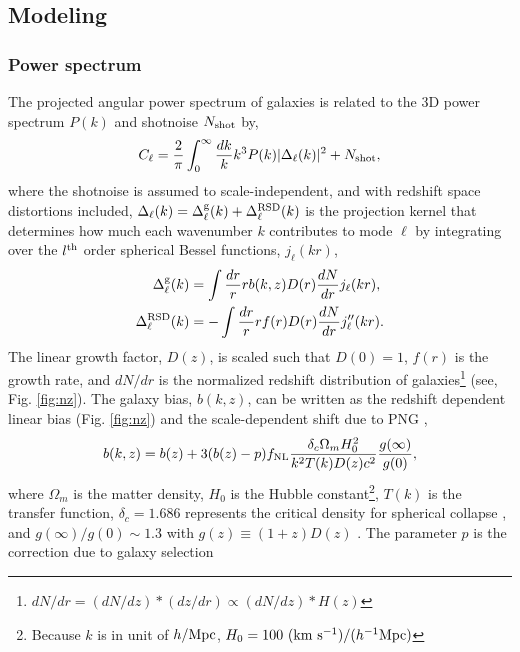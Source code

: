  \subsection{Modeling}

\subsubsection{Power spectrum}
The projected angular power spectrum of galaxies is related to the 3D power spectrum $P(k)$  \citep[see, e.g.,][]{Padmanabhan2007} and shotnoise $N_{\rm shot}$ by,
\begin{equation}\label{eq:cell}
    C_{\ell} = \frac{2}{\pi}\int_{0}^{\infty}\frac{dk}{k}k^{3}P(k)|\Delta_{\ell}(k)|^{2} + N_{\rm shot},
\end{equation}
where the shotnoise is assumed to scale-independent, and with redshift space distortions included, $\Delta_{\ell}(k) = \Delta^{\rm g}_{\ell}(k) + \Delta^{\rm RSD}_{\ell}(k)$ is the projection kernel that determines how much each wavenumber $k$ contributes to mode $\ell$ by integrating over the $l^{\rm th}$ order spherical Bessel functions, $ j_{\ell}(kr)$,
\begin{align}
    \Delta^{\rm g}_{\ell}(k) &= \int \frac{dr}{r} r b(k, z) D(r) \frac{dN}{dr} j_{\ell}(kr),\\
    \Delta^{\rm RSD}_{\ell}(k) &= - \int \frac{dr}{r} r f(r) D(r) \frac{dN}{dr} j^{\prime\prime}_{\ell}(kr).
\end{align}
The linear growth factor, $D(z)$, is scaled such that $D(0)=1$, $f(r)$ is the growth rate, and $dN/dr$ is the normalized redshift distribution of galaxies\footnote{$dN/dr = (dN/dz)*(dz/dr) \propto (dN/dz)*H(z)$} (see, Fig. \ref{fig:nz}). The galaxy bias, $b(k,z)$, can be written as the redshift dependent linear bias (Fig. \ref{fig:nz}) and the scale-dependent shift due to PNG \citep{slosar2008constraints},
\begin{equation}
b(k, z) = b(z) + 3 (b(z) - p) f_{\rm NL} \frac{\delta_{c} \Omega_{m} H^{2}_{0}}{k^{2}T(k)D(z) c^{2}} \frac{g(\infty)}{g(0)},
\end{equation}
where $\Omega_{m}$ is the matter density, $H_{0}$ is the Hubble constant\footnote{Because $k$ is in unit of $h/{\rm Mpc}$, $H_{0}=100~({\rm km}~{\rm s}^{-1})/(h^{-1}{\rm Mpc})$}, $T(k)$ is the transfer function, $\delta_{c}=1.686$ represents the critical density for spherical collapse \citep{fillmore1984self}, and $g(\infty)/g(0) \sim 1.3$ with $g(z)\equiv (1+z) D(z)$ . The parameter $p$ is the correction due to galaxy selection

